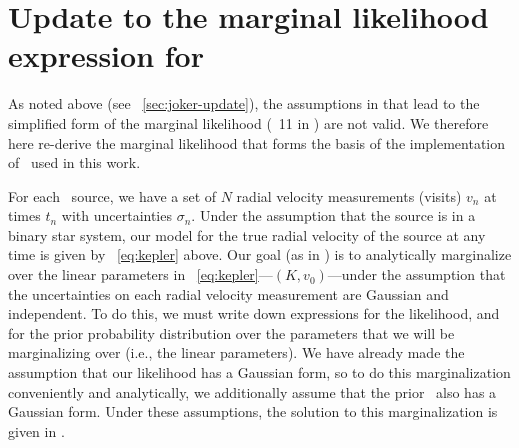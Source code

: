 \documentclass[modern]{aastex63}
\begin{document}
\appendix

\section{Update to the marginal likelihood expression for \thejoker}
\label{app:marginal-likelihood}

As noted above (see \sectionname~\ref{sec:joker-update}), the assumptions in
\cite{thejoker} that lead to the simplified form of the marginal likelihood
(\equationname~11 in \citealt{thejoker}) are not valid.
We therefore here re-derive the marginal likelihood that forms the basis of the
implementation of \thejoker\ used in this work.

For each \apogee\ source, we have a set of $N$ radial velocity measurements
(visits) $v_n$ at times $t_n$ with uncertainties $\sigma_n$.
Under the assumption that the source is in a binary star system, our model for
the true radial velocity of the source at any time is given by
\equationname~\ref{eq:kepler} above.
Our goal (as in \citealt{thejoker}) is to analytically marginalize over the
linear parameters in \equationname~\ref{eq:kepler}---$(K, v_0)$---under the
assumption that the uncertainties on each radial velocity measurement are
Gaussian and independent.
To do this, we must write down expressions for the likelihood, and for the prior
probability distribution over the parameters that we will be marginalizing over
(i.e., the linear parameters).
We have already made the assumption that our likelihood has a Gaussian form, so
to do this marginalization conveniently and analytically, we additionally assume
that the prior \pdf\ also has a Gaussian form.
Under these assumptions, the solution to this marginalization is given in
\cite{Hogg:2020}.
\end{document}
